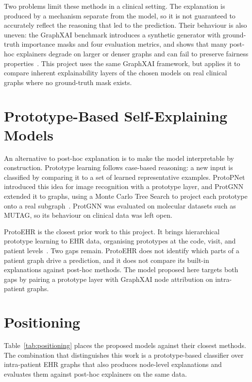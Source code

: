 Two problems limit these methods in a clinical setting. The explanation is
produced by a mechanism separate from the model, so it is not guaranteed to
accurately reflect the reasoning that led to the prediction. Their behaviour is also
uneven: the GraphXAI benchmark introduces a synthetic generator with
ground-truth importance masks and four evaluation metrics, and shows that many
post-hoc explainers degrade on larger or denser graphs and can fail to preserve
fairness properties~\cite{agarwal2023graphxai}. This project uses the same
GraphXAI framework, but applies it to compare inherent explainability layers of the chosen models on real clinical graphs where no ground-truth mask exists.

\section{Prototype-Based Self-Explaining Models}

An alternative to post-hoc explanation is to make the model interpretable by
construction. Prototype learning follows case-based reasoning: a new input is
classified by comparing it to a set of learned representative examples. ProtoPNet
introduced this idea for image recognition with a prototype layer, and ProtGNN
extended it to graphs, using a Monte Carlo Tree Search to project each prototype
onto a real subgraph~\cite{zhang2022protgnn}. ProtGNN was evaluated on molecular
datasets such as MUTAG, so its behaviour on clinical data was left open.

ProtoEHR is the closest prior work to this project. It brings hierarchical
prototype learning to EHR data, organising prototypes at the code, visit, and
patient levels~\cite{cai2025protoehr}. Two gaps remain. ProtoEHR does not
identify which parts of a patient graph drive a prediction, and it does not
compare its built-in explanations against post-hoc methods. The model proposed
here targets both gaps by pairing a prototype layer with GraphXAI node attribution on intra-patient graphs.

\section{Positioning}

Table~\ref{tab:positioning} places the proposed models against their closest
methods. The combination that distinguishes this work is a prototype-based
classifier over intra-patient EHR graphs that also produces node-level
explanations and evaluates them against post-hoc explainers on the same data.

